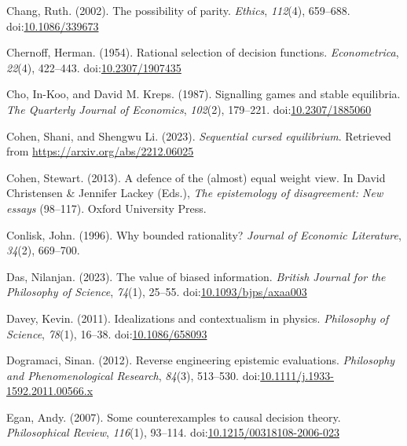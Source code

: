 \documentclass[
  12pt,
  letterpaper,
  DIV=11,
  numbers=noendperiod]{scrreprt}
\newlength{\cslhangindent}
\newenvironment{CSLReferences}[2] %
 {\begin{list}{}{%
  \setlength{\itemindent}{0pt}
  \setlength{\leftmargin}{0pt}
  \setlength{\parsep}{0pt}
  \ifodd #1
   \setlength{\leftmargin}{\cslhangindent}
   \setlength{\itemindent}{-1\cslhangindent}
  \fi
  \setlength{\itemsep}{#2\baselineskip}}}
 {\end{list}}
\begin{document}
\begin{CSLReferences}{1}{0}
Chang, Ruth. (2002). The possibility of parity. \emph{Ethics},
\emph{112}(4), 659--688.
doi:\href{https://doi.org/10.1086/339673}{10.1086/339673}

Chernoff, Herman. (1954). Rational selection of decision functions.
\emph{Econometrica}, \emph{22}(4), 422--443.
doi:\href{https://doi.org/10.2307/1907435}{10.2307/1907435}

Cho, In-Koo, and David M. Kreps. (1987). Signalling games and stable
equilibria. \emph{The Quarterly Journal of Economics}, \emph{102}(2),
179--221. doi:\href{https://doi.org/10.2307/1885060}{10.2307/1885060}

Cohen, Shani, and Shengwu Li. (2023). \emph{Sequential cursed
equilibrium}. Retrieved from \url{https://arxiv.org/abs/2212.06025}

Cohen, Stewart. (2013). A defence of the (almost) equal weight view. In
David Christensen \& Jennifer Lackey (Eds.), \emph{The epistemology of
disagreement: New essays} (98--117). Oxford University Press.

Conlisk, John. (1996). Why bounded rationality? \emph{Journal of
Economic Literature}, \emph{34}(2), 669--700.

Das, Nilanjan. (2023). The value of biased information. \emph{British
Journal for the Philosophy of Science}, \emph{74}(1), 25--55.
doi:\href{https://doi.org/10.1093/bjps/axaa003}{10.1093/bjps/axaa003}

Davey, Kevin. (2011). Idealizations and contextualism in physics.
\emph{Philosophy of Science}, \emph{78}(1), 16--38.
doi:\href{https://doi.org/10.1086/658093}{10.1086/658093}

Dogramaci, Sinan. (2012). Reverse engineering epistemic evaluations.
\emph{Philosophy and Phenomenological Research}, \emph{84}(3), 513--530.
doi:\href{https://doi.org/10.1111/j.1933-1592.2011.00566.x}{10.1111/j.1933-1592.2011.00566.x}

Egan, Andy. (2007). Some counterexamples to causal decision theory.
\emph{Philosophical Review}, \emph{116}(1), 93--114.
doi:\href{https://doi.org/10.1215/00318108-2006-023}{10.1215/00318108-2006-023}


\end{CSLReferences}
\end{document}
